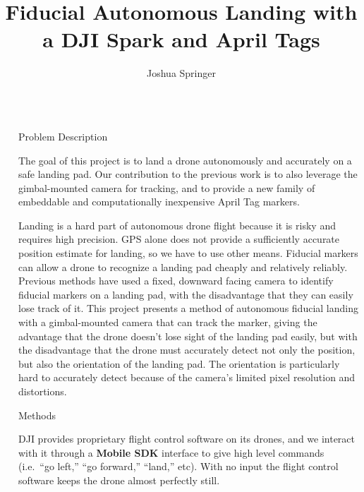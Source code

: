 \documentclass[final, 20pt]{beamer}
\title{Fiducial Autonomous Landing with a DJI Spark and April Tags}
\author{Joshua Springer}
\institute[shortinst]{Reykjavík University}
\newlength{\sepwidth}
\newlength{\colwidth}
\newcommand{\separatorcolumn}{\begin{column}{\sepwidth}\end{column}}
\begin{document}
\begin{frame}[t]
\begin{columns}[t]
\separatorcolumn

\begin{column}{\colwidth}

  \begin{alertblock}{Problem Description}

    The goal of this project is to land a drone autonomously and accurately on a safe landing pad.
    Our contribution to the previous work is to also leverage the gimbal-mounted camera for tracking,
    and to provide a new family of embeddable and computationally inexpensive April Tag markers.

    Landing is a hard part of autonomous drone flight because it is risky and requires high precision.
    GPS alone does not provide a sufficiently accurate position estimate for landing,
    so we have to use other means.
    Fiducial markers can allow a drone to recognize a landing pad cheaply and relatively reliably.
    Previous methods have used a fixed, downward facing camera to identify fiducial markers on a landing pad,
    with the disadvantage that they can easily lose track of it.
    This project presents a method of autonomous fiducial landing with a gimbal-mounted camera that can track the marker,
    giving the advantage that the drone doesn't lose sight of the landing pad easily,
    but with the disadvantage that the drone must accurately detect not only the position,
    but also the orientation of the landing pad.
    The orientation is particularly hard to accurately detect because of the camera's limited pixel resolution and distortions.

  \end{alertblock}

  \begin{block}{Methods}


    DJI provides proprietary flight control software on its drones,
    and we interact with it through a \textbf{Mobile SDK} interface
    to give high level commands (i.e.~``go left,'' ``go forward,'' ``land,'' etc).
    With no input the flight control software keeps the drone almost perfectly still.



\end{block}
\end{column}
\end{columns}
\end{frame}
\end{document}
